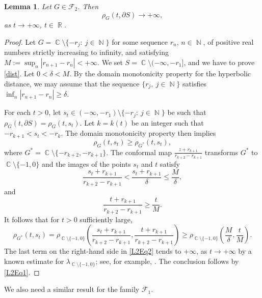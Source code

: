 \documentclass[11pt, letterpaper,leqno]{amsart}
\numberwithin{equation}{section}
\newtheorem{lemma}{Lemma}[section]
\theoremstyle{definition}
\DeclareMathOperator{\N}{\mathbb{N}}
\DeclareMathOperator{\C}{\mathbb{C}}
\DeclareMathOperator{\R}{\mathbb{R}}
\begin{document}
\begin{lemma}\label{L2}
Let $G\in \mathcal{F}_2$. Then 
\begin{equation}\label{dist}
\rho_G(t,\partial S)\to +\infty,
\end{equation}
as $t\to +\infty$, $t\in\R$.
\end{lemma}
\begin{proof}
Let $G=\C\setminus\{-r_j:\ j\in\N\}$ for some sequence $r_n$, $n\in\N$, of positive real numbers strictly increasing to infinity, and satisfying $M:=\sup_n |r_{n+1}-r_n|<+\infty$. We set $S=\C\setminus (-\infty,-r_1]$, and we have to prove \eqref{dist}. Let $0<\delta<M$. By the domain monotonicity property for the hyperbolic distance, we may assume that the sequence $\{r_j,\ j\in\N\}$ satisfies $\inf_n |r_{n+1}-r_n|\geq \delta$.

For each $t>0$, let $s_t\in (-\infty,-r_1)\setminus\{-r_j:\ j\in\N\}$ be  such that $\rho_G(t,\partial S)=\rho_G(t,s_t)$. Let $k=k(t)$ be an integer such that $-r_{k+1}<s_t<-r_k$. The domain monotonicity property then implies
\begin{equation}\label{L2Eq1}
\rho_G(t,s_t)\geq \rho_{G^*}(t,s_t),
\end{equation}
where $G^*=\C\setminus\{-r_{k+2},-r_{k+1}\}$. The conformal map $\frac{z+r_{k+1}}{r_{k+2}-r_{k+1}}$ transforms $G^*$ to $\C\setminus\{-1,0\}$ and the images of the points $s_t$ and $t$ satisfy 
\[
\frac{s_t+r_{k+1}}{r_{k+2}-r_{k+1}}<\frac{s_t+r_{k+1}}{\delta}\leq\frac{M}{\delta},
\]
and
\[
\frac{t+r_{k+1}}{r_{k+2}-r_{k+1}}\geq\frac{t}{M}.
\]
It follows that for $t>0$ sufficiently large,
\begin{equation}\label{L2Eq2}
\rho_{G^*}(t,s_t)=\rho_{\C\setminus\{-1,0\}}\left(\frac{s_t+r_{k+1}}{r_{k+2}-r_{k+1}},\frac{t+r_{k+1}}{r_{k+2}-r_{k+1}}\right)\geq\rho_{\C\setminus\{-1,0\}}\left(\frac{M}{\delta},\frac{t}{M}\right).
\end{equation}
 The last term on the right-hand side in \eqref{L2Eq2} tends to $+\infty$, as $t\to +\infty$ by a known estimate for $\lambda_{\C\setminus\{-1,0\}}$; see, for example, \cite[Eq. (1.5)]{BP}. The conclusion follows by \eqref{L2Eq1}.
\end{proof}

We also need a similar result for the family $\mathcal{F}_1$. 
\end{document}
